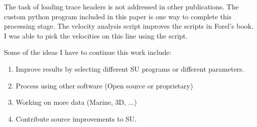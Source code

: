 The task of loading trace headers is not addressed in other
publications.  The custom python program included in this paper is one
way to complete this processing stage.  The velocity analysis script 
improves the scripts in Forel's book.  I was able to pick the velocities 
on this line using the script.

Some of the ideas I have to continue this work include:
\begin{enumerate}
\item Improve results by selecting different SU programs or different 
parameters. 
\item Process using other software (Open source or proprietary)
\item Working on more data (Marine, 3D, ...)
\item Contribute source improvements to SU.
\end{enumerate}




